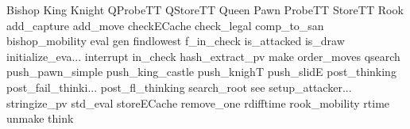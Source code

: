Bishop
King
Knight
QProbeTT
QStoreTT
Queen
Pawn
ProbeTT
StoreTT
Rook
add_capture
add_move
checkECache
check_legal
comp_to_san
bishop_mobility
eval
gen
findlowest
f_in_check
is_attacked
is_draw
initialize_eva...
interrupt
in_check
hash_extract_pv
make
order_moves
qsearch
push_pawn_simple
push_king_castle
push_knighT
push_slidE
post_thinking
post_fail_thinki...
post_fl_thinking
search_root
see
setup_attacker...
stringize_pv
std_eval
storeECache
remove_one
rdifftime
rook_mobility
rtime
unmake
think
